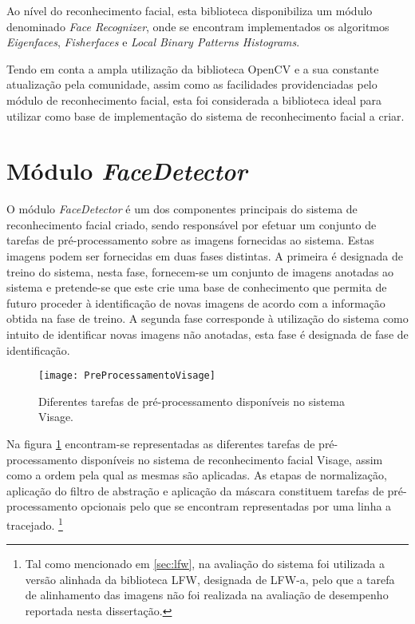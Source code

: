 Ao nível do reconhecimento facial, esta biblioteca disponibiliza um módulo denominado \textit{Face Recognizer}, onde se encontram implementados os algoritmos \textit{Eigenfaces}, \textit{Fisherfaces} e \textit{Local Binary Patterns Histograms}.

Tendo em conta a ampla utilização da biblioteca OpenCV e a sua constante atualização pela comunidade, assim como as facilidades providenciadas pelo módulo de reconhecimento facial, esta foi considerada a biblioteca ideal para utilizar como base de implementação do sistema de reconhecimento facial a criar. 


\section{Módulo \textit{FaceDetector}} \label{sec:facedetector}
O módulo \textit{FaceDetector} é um dos componentes principais do sistema de reconhecimento facial criado, sendo responsável por efetuar um conjunto de tarefas de pré-processamento sobre as imagens fornecidas ao sistema. Estas imagens podem ser fornecidas em duas fases distintas. A primeira é designada de treino do sistema, nesta fase, fornecem-se um conjunto de imagens anotadas ao sistema e pretende-se que este crie uma base de conhecimento que permita de futuro proceder à identificação de novas imagens de acordo com a informação obtida na fase de treino. A segunda fase corresponde à utilização do sistema como intuito de identificar novas imagens não anotadas, esta fase é designada de fase de identificação.

\begin{figure}[t]
  \begin{center}
    \leavevmode
    \texttt{[image: PreProcessamentoVisage]}
    \caption{Diferentes tarefas de pré-processamento disponíveis no sistema Visage.}
    \label{fig:preprocessamento}
  \end{center}
\end{figure}


Na figura \ref{fig:preprocessamento} encontram-se representadas as diferentes tarefas de pré-processamento disponíveis no sistema de reconhecimento facial Visage, assim como a ordem pela qual as mesmas são aplicadas. As etapas de normalização, aplicação do filtro de abstração e aplicação da máscara constituem tarefas de pré-processamento opcionais pelo que se encontram representadas por uma linha a tracejado. \footnote{Tal como mencionado em \ref{sec:lfw}, na avaliação do sistema foi utilizada a versão alinhada da biblioteca LFW, designada de LFW-a, pelo que a tarefa de alinhamento das imagens não foi realizada na avaliação de desempenho reportada nesta dissertação.}


